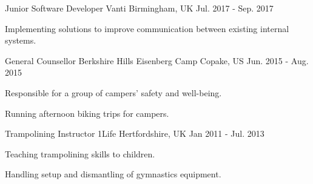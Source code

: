 

\begin{cventries}

  \cventry
    {Junior Software Developer} %
    {Vanti} %
    {Birmingham, UK} %
    {Jul. 2017 - Sep. 2017} %
    {
      \begin{cvitems} %
        \item {Implementing solutions to improve communication between existing internal systems.}
      \end{cvitems}
    }

  \cventry
    {General Counsellor} %
    {Berkshire Hills Eisenberg Camp} %
    {Copake, US} %
    {Jun. 2015 - Aug. 2015} %
    {
      \begin{cvitems} %
        \item {Responsible for a group of campers' safety and well-being.}
        \item {Running afternoon biking trips for campers.}
      \end{cvitems}
    }

  \cventry
    {Trampolining Instructor} %
    {1Life} %
    {Hertfordshire, UK} %
    {Jan 2011 - Jul. 2013} %
    {
      \begin{cvitems} %
        \item {Teaching trampolining skills to children.}
        \item {Handling setup and dismantling of gymnastics equipment.}
      \end{cvitems}
    }

\end{cventries}

